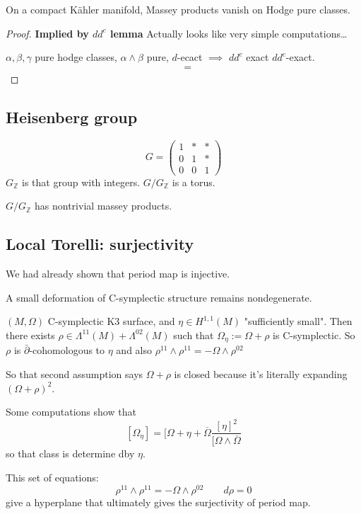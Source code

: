\begin{thm}\leavevmode
	 On a compact Kähler manifold, Massey products vanish on Hodge pure classes.
\end{thm}

\begin{proof}\leavevmode
\textbf{Implied by $d d^c$ lemma} 	Actually looks like very simple computations…

	$\alpha, \beta, \gamma$ pure hodge classes, $\alpha\wedge \beta$ pure, $d$-ecact  $\implies $ $d d^c$ exact $d d^c$-exact.
	\begin{align*}
		&=
	\end{align*}
\end{proof}

\subsection{Heisenberg group}

\begin{defn}\leavevmode
	\[G=\begin{pmatrix}1&*&*\\ 0&1&*\\ 0&0&1\end{pmatrix}\]
	$G_{\mathbb{Z}}$ is that group with integers. $G/G_\mathbb{Z}$ is a torus.
\end{defn}

\begin{thm}\leavevmode
	$G/G_\mathbb{Z}$ has nontrivial massey products.
\end{thm}

\subsection{Local Torelli: surjectivity}

We had already shown that period map is injective.

\begin{thm}\leavevmode
	A small deformation of C-symplectic structure remains nondegenerate.

	$(M,\Omega)$ C-symplectic K3 surface, and $\eta\in H^{1,1}(M)$ "sufficiently small". Then there exists $\rho \in\Lambda^{11}(M)+\Lambda^{02}(M)$ such that $\Omega_\eta :=\Omega+\rho$ is C-symplectic. So $\rho$ is $\bar\partial$-cohomologous to $\eta$ and also $\rho^{11}\wedge \rho^{11}=-\Omega\wedge \rho^{02}$\end{thm}

	So that second assumption says $\Omega+\rho$ is closed because it's literally expanding $(\Omega+\rho)^2$.

	\begin{remark}\leavevmode
		Some computations show that
		\[ [\Omega_\eta]=[\Omega+\eta+\overline{\Omega}\frac{[\eta]^2}{[\Omega\wedge \overline{\Omega}}\]
		so that class is determine dby $\eta$.
	\end{remark}

	\begin{remark}\leavevmode
		This set of equations:
		\[\rho^{11}\wedge \rho^{11}=-\Omega\wedge \rho^{02}\qquad d\rho=0\]
		give a hyperplane that ultimately gives the surjectivity of period map.
	\end{remark}


